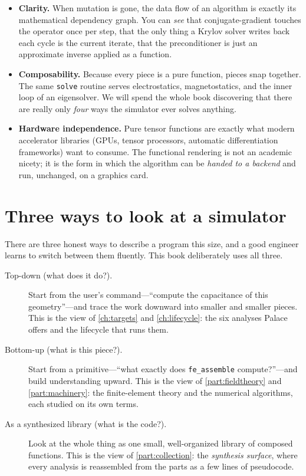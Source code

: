 \begin{itemize}
  \item \textbf{Clarity.} When mutation is gone, the data flow of an algorithm
  is exactly its mathematical dependency graph. You can \emph{see} that
  conjugate-gradient touches the operator once per step, that the only thing a
  Krylov solver writes back each cycle is the current iterate, that the
  preconditioner is just an approximate inverse applied as a function.
  \item \textbf{Composability.} Because every piece is a pure function, pieces
  snap together. The same \texttt{solve} routine serves electrostatics,
  magnetostatics, and the inner loop of an eigensolver. We will spend the whole
  book discovering that there are really only \emph{four} ways the simulator
  ever solves anything.
  \item \textbf{Hardware independence.} Pure tensor functions are exactly what
  modern accelerator libraries (GPUs, tensor processors, automatic
  differentiation frameworks) want to consume. The functional rendering is not
  an academic nicety; it is the form in which the algorithm can be \emph{handed
  to a backend} and run, unchanged, on a graphics card.
\end{itemize}

\section*{Three ways to look at a simulator}

There are three honest ways to describe a program this size, and a good engineer
learns to switch between them fluently. This book deliberately uses all three.

\begin{description}
  \item[Top-down (what does it do?).] Start from the user's command---``compute
  the capacitance of this geometry''---and trace the work downward into smaller
  and smaller pieces. This is the view of \cref{ch:targets} and
  \cref{ch:lifecycle}: the six analyses Palace offers and the lifecycle that
  runs them.
  \item[Bottom-up (what is this piece?).] Start from a primitive---``what
  exactly does \texttt{fe\_assemble} compute?''---and build understanding
  upward. This is the view of \cref{part:fieldtheory} and
  \cref{part:machinery}: the finite-element theory and the numerical
  algorithms, each studied on its own terms.
  \item[As a synthesized library (what is the code?).] Look at the whole thing
  as one small, well-organized library of composed functions. This is the view
  of \cref{part:collection}: the \emph{synthesis surface}, where every analysis
  is reassembled from the parts as a few lines of pseudocode.
\end{description}

